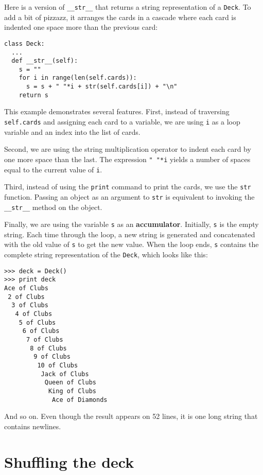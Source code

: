 Here is a version of {\tt \_\_str\_\_} that returns a string
representation of a {\tt Deck}.
To add a bit of pizzazz, it arranges the cards in a cascade
where each card is indented one space more than the previous card:

\beforeverb
\begin{verbatim}
class Deck:
  ...
  def __str__(self):
    s = ""
    for i in range(len(self.cards)):
      s = s + " "*i + str(self.cards[i]) + "\n"
    return s
\end{verbatim}
\afterverb
%
This example demonstrates several features.  First, instead of
traversing {\tt self.cards} and assigning each card to a variable,
we are using {\tt i} as a loop
variable and an index into the list of cards.

Second, we are using the string multiplication operator to indent
each card by one more space than the last.  The expression
{\tt " "*i} yields a number of spaces equal to the current value
of {\tt i}.

Third, instead of using the {\tt print} command to print the cards,
we use the {\tt str} function.  Passing an object as an argument to
{\tt str} is equivalent to invoking the {\tt \_\_str\_\_} method on
the object.


Finally, we are using the variable {\tt s} as an {\bf accumulator}.
Initially, {\tt s} is the empty string.  Each time through the loop, a
new string is generated and concatenated with the old value of {\tt s}
to get the new value.  When the loop ends, {\tt s} contains the
complete string representation of the {\tt Deck}, which looks like
this:

\pagebreak

\beforeverb
\begin{verbatim}
>>> deck = Deck()
>>> print deck
Ace of Clubs
 2 of Clubs
  3 of Clubs
   4 of Clubs
    5 of Clubs
     6 of Clubs
      7 of Clubs
       8 of Clubs
        9 of Clubs
         10 of Clubs
          Jack of Clubs
           Queen of Clubs
            King of Clubs
             Ace of Diamonds
\end{verbatim}
\afterverb
%
And so on.  Even though the result appears on 52 lines, it is
one long string that contains newlines.


\section{Shuffling the deck}

